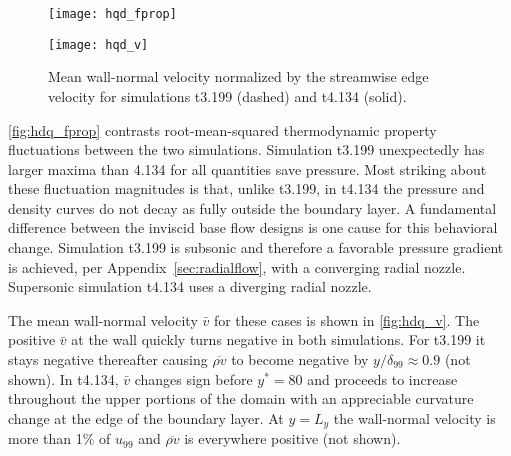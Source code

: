 \begin{figure}[p]
\centering
\texttt{[image: hqd\_fprop]}
\caption[RMS thermodynamic fluctuations in simulations t3.199 and t4.134]{%
    Root-mean-squared thermodynamic property fluctuations normalized by local
    means for simulations t3.199 (above, dashed) and t4.134 (below,
    solid).\label{fig:hdq_fprop}
}
\bigskip\medskip
\texttt{[image: hqd\_v]}
\caption[Mean wall-normal velocity for simulations t3.199 and t4.134]{%
    Mean wall-normal velocity normalized by the streamwise edge velocity
    for simulations t3.199 (dashed) and t4.134 (solid).\label{fig:hdq_v}
}
\end{figure}

\autoref{fig:hdq_fprop} contrasts root-mean-squared thermodynamic property
fluctuations between the two simulations.  Simulation t3.199 unexpectedly has
larger maxima than 4.134 for all quantities save pressure.
%
Most striking about these fluctuation magnitudes is that, unlike t3.199, in
t4.134 the pressure and density curves do not decay as fully outside
the boundary layer.
%
A fundamental difference between the inviscid base flow designs is one cause for
this behavioral change.  Simulation t3.199 is subsonic and therefore a favorable
pressure gradient is achieved, per Appendix~\ref{sec:radialflow}, with a
converging radial nozzle.  Supersonic simulation t4.134 uses a diverging radial
nozzle.

The mean wall-normal velocity $\bar{v}$ for these cases is shown in
\autoref{fig:hdq_v}.  The positive $\bar{v}$ at the wall quickly turns negative
in both simulations.  For t3.199 it stays negative thereafter causing
$\overline{\rho{}v}$ to become negative by $y/\delta_{99}\approx{}0.9$ (not
shown).  In t4.134, $\bar{v}$ changes sign before $y^\ast=80$ and proceeds to
increase throughout the upper portions of the domain with an appreciable curvature
change at the edge of the boundary layer.  At $y=L_y$ the wall-normal velocity
is more than 1\% of $u_{99}$ and $\overline{\rho v}$ is everywhere positive (not
shown).

